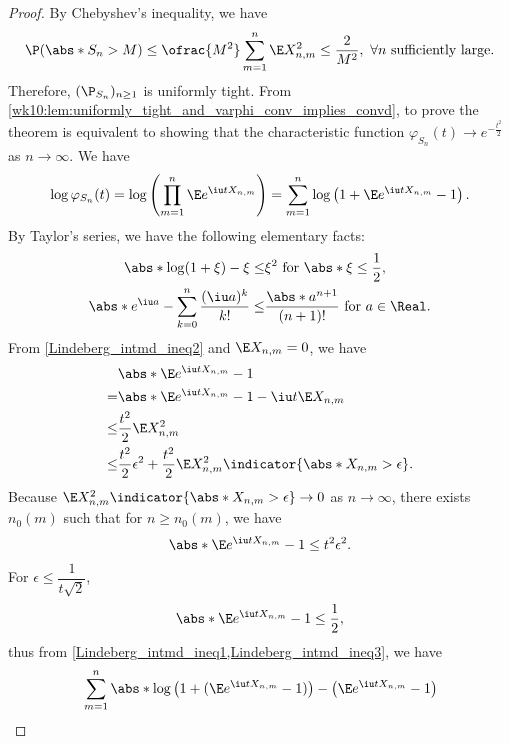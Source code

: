 \documentclass[../aipt.tex]{subfiles}
\begin{document}
\begin{proof}
By Chebyshev's inequality, we have
\begin{align*}
\P(\abs*{S_n} > M) \leq \ofrac{M^2} \sum_{m=1}^n \E X_{n,m}^2 \leq \frac{2}{M^2}, \ \forall n \ \text{sufficiently large}.
\end{align*}
Therefore, $(\P_{S_n})_{n\geq 1}$ is uniformly tight. From \cref{wk10:lem:uniformly_tight_and_varphi_conv_implies_convd}, to prove the theorem is equivalent to showing that the characteristic function $\varphi_{S_n}(t) \to e^{-\frac{t^2}{2}}$ as $n\to\infty$. We have
\begin{align*}
\log \varphi_{S_n}(t) 
= \log \left( \prod_{m=1}^n \E e^{\iu tX_{n,m}} \right) 
= \sum_{m=1}^n \log \left( 1 + \E e^{\iu tX_{n,m}} - 1 \right).
\end{align*}
By Taylor's series, we have the following elementary facts:
\begin{align} 
\abs*{\log(1+\xi) - \xi} 
\leq& \xi^2 \ \text{for}\ \abs*{\xi} \leq \frac{1}{2}, \label{Lindeberg_intmd_ineq1}\\ 
\abs*{e^{\iu a} - \sum_{k=0}^n \frac{(\iu a)^k}{k!}}
\leq& \frac{\abs*{a}^{n+1}}{(n+1)!} \text{ for } a\in\Real.\label{Lindeberg_intmd_ineq2}
\end{align}
From \cref{Lindeberg_intmd_ineq2} and $\E X_{n,m} = 0$, we have
\begin{align} \nonumber
&\abs*{\E e^{\iu t X_{n,m}} - 1} \\ \nonumber
=& \abs*{\E e^{\iu t X_{n,m}} - 1 - \iu t\E X_{n,m}} \\ \label{Lindeberg_intmd_ineq3}
\leq& \frac{t^2}{2} \E X_{n,m}^2 \\ \nonumber
\leq& \frac{t^2}{2} \epsilon^2 + \frac{t^2}{2}  \E X_{n,m}^2 \indicator{\abs*{X_{n,m}} > \epsilon}.
\end{align}
Because $\E X_{n,m}^2 \indicator{\abs*{X_{n,m} > \epsilon}} \to 0$ as $n \to \infty$, there exists $n_0(m)$ such that for $n \geq n_0(m)$, we have 
\begin{align*}
\abs*{\E e^{\iu t X_{n,m}} - 1}  \leq t^2\epsilon^2. 
\end{align*}
For $\epsilon \leq \dfrac{1}{t \sqrt{2}}$, 
\begin{align*}
\abs*{\E e^{\iu t X_{n,m}} - 1} \leq \frac{1}{2},
\end{align*}
thus from \cref{Lindeberg_intmd_ineq1,Lindeberg_intmd_ineq3}, we have
\begin{align*}
&\sum_{m=1}^n \abs*{\log \left(1+(\E e^{\iu t X_{n,m}} - 1)\right) - \left( \E e^{\iu t X_{n,m}} - 1 \right)} \\

\end{align*}
\end{proof}
\end{document}
